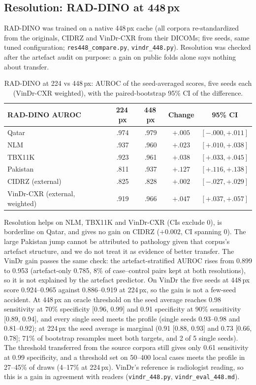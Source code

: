 \documentclass[10pt,a4paper]{article}
\begin{document}
\subsection*{Resolution: RAD-DINO at 448\,px}\label{sec:res448}
RAD-DINO was trained on a native 448\,px cache (all corpora re-standardized from the originals, CIDRZ and VinDr-CXR from their DICOMs; five seeds, same tuned configuration; \texttt{res448\_compare.py}, \texttt{vindr\_448.py}). Resolution was checked after the artefact audit on purpose: a gain on public folds alone says nothing about transfer.
\begin{table}[H]\centering\small
\begin{tabular}{lcccc}\toprule
RAD-DINO AUROC & 224\,px & 448\,px & Change & 95\% CI\\\midrule
Qatar & .974 & .979 & $+.005$ & $[-.000,+.011]$\\
NLM & .937 & .960 & $+.023$ & $[+.010,+.038]$\\
TBX11K & .923 & .961 & $+.038$ & $[+.033,+.045]$\\
Pakistan & .811 & .937 & $+.127$ & $[+.116,+.138]$\\
CIDRZ (external) & .825 & .828 & $+.002$ & $[-.027,+.029]$\\
VinDr-CXR (external, weighted) & .919 & .966 & $+.047$ & $[+.037,+.057]$\\\bottomrule
\end{tabular}\caption{RAD-DINO at 224 vs 448\,px: AUROC of the seed-averaged scores, five seeds each (VinDr-CXR weighted), with the paired-bootstrap 95\% CI of the difference.}\end{table}
Resolution helps on NLM, TBX11K and VinDr-CXR (CIs exclude 0), is borderline on Qatar, and gives no gain on CIDRZ ($+0.002$, CI spanning 0). The large Pakistan jump cannot be attributed to pathology given that corpus's artefact structure, and we do not treat it as evidence of better transfer. The VinDr gain passes the same check: the artefact-stratified AUROC rises from 0.899 to 0.953 (artefact-only 0.785, 8\% of case--control pairs kept at both resolutions), so it is not explained by the artefact predictor. On VinDr the five seeds at 448\,px score 0.924--0.965 against 0.886--0.919 at 224\,px, so the gain is not a few-seed accident. At 448\,px an oracle threshold on the seed average reaches 0.98 sensitivity at 70\% specificity [0.96, 0.99] and 0.91 specificity at 90\% sensitivity [0.89, 0.94], and every single seed meets the profile (single seeds 0.93--0.98 and 0.81--0.92); at 224\,px the seed average is marginal (0.91 [0.88, 0.93] and 0.73 [0.66, 0.78]; 71\% of bootstrap resamples meet both targets, and 2 of 5 single seeds). The threshold transferred from the source corpora still gives only 0.61 sensitivity at 0.99 specificity, and a threshold set on 50--400 local cases meets the profile in 27--45\% of draws (4--17\% at 224\,px). VinDr's reference is radiologist reading, so this is a gain in agreement with readers (\texttt{vindr\_448.py}, \texttt{vindr\_eval\_448.md}).
\end{document}
